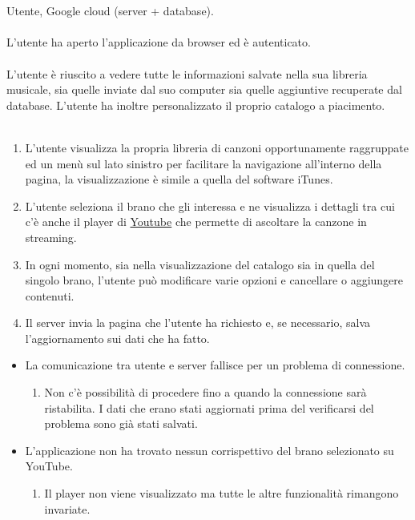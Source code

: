 \newpage
\vspace*{0.5cm}
\\\\
 Utente, Google cloud (server + database). \\\\
 L'utente ha aperto l'applicazione da browser ed \`e
autenticato. \\\\ 
 L'utente \`e riuscito a vedere tutte le informazioni
salvate nella sua libreria musicale, sia quelle inviate dal suo computer sia
quelle aggiuntive recuperate dal database. L'utente ha inoltre
personalizzato il proprio catalogo a piacimento. \\\\
\begin{enumerate}
  \item L'utente visualizza la propria libreria di canzoni
  opportunamente raggruppate ed un men\`u sul lato sinistro per facilitare la
  navigazione all'interno della pagina, la visualizzazione \`e simile a quella
  del software iTunes.
  \item L'utente seleziona il brano che gli interessa e ne visualizza i
  dettagli tra cui c'\`e anche il player di \underline{Youtube} che permette di ascoltare la
  canzone in streaming.
  \item In ogni momento, sia nella visualizzazione del catalogo sia in quella
  del singolo brano, l'utente pu\`o modificare varie opzioni e cancellare o
  aggiungere contenuti.
  \item Il server invia la pagina che l'utente ha richiesto e, se necessario,
  salva l'aggiornamento sui dati che ha fatto.
\end{enumerate}
\begin{itemize}
  \item La comunicazione tra utente e server fallisce per un problema di
  connessione.
  \begin {enumerate}
    \item Non c'\`e possibilit\`a di procedere fino a quando la connessione sar\`a
    ristabilita. I dati che erano stati aggiornati prima del verificarsi del
    problema sono gi\`a stati salvati.
  \end{enumerate}
  \item L'applicazione non ha trovato nessun corrispettivo del brano
  selezionato su YouTube.
  \begin {enumerate}
    \item Il player non viene visualizzato ma tutte le altre funzionalit\`a
    rimangono invariate.
  \end{enumerate}
\end{itemize}
\newpage


